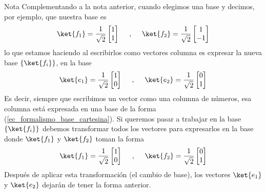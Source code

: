 \documentclass[a4paper,11pt]{book} %
\numberwithin{equation}{chapter}
\begin{document}
	\begin{mybox_blue}{Nota}
	Complementando a la nota anterior, cuando elegimos una base y decimos, por ejemplo, que nuestra base es
		\begin{equation*}
		\ket{f_1} = \frac{1}{\sqrt{2}}\begin{bmatrix}
		1 \\ 1
		\end{bmatrix} ~~~~,~~~~
		\ket{f_2} = \frac{1}{\sqrt{2}}\begin{bmatrix}
		1 \\ - 1
		\end{bmatrix}
		\end{equation*}
	lo que estamos haciendo al escribirlos como vectores columna es expresar la nueva base $\{\ket{f_i}\}$, en la base
		\begin{equation*}
		\ket{e_1} = \frac{1}{\sqrt{2}}\begin{bmatrix}
		1 \\ 0
		\end{bmatrix} ~~~~,~~~~
		\ket{e_2} = \frac{1}{\sqrt{2}}\begin{bmatrix}
		0 \\  1
		\end{bmatrix}
		\end{equation*}
	Es decir, siempre que escribimos un vector como una columna de números, esa columna está expresada en una base de la forma (\ref{ec_formalismo_base_cartesina}). Si queremos pasar a trabajar en la base $\{\ket{f_i}\}$ debemos transformar todos los vectores para expresarlos en la base donde $\ket{f_1}$ y $\ket{f_2}$ toman la forma
		\begin{equation*}
		\ket{f_1} = \frac{1}{\sqrt{2}}\begin{bmatrix}
		1 \\ 0
		\end{bmatrix} ~~~~,~~~~
		\ket{f_2} = \frac{1}{\sqrt{2}}\begin{bmatrix}
		0 \\  1
		\end{bmatrix}
		\end{equation*}
	Después de aplicar esta transformación (el cambio de base), los vectores $\ket{e_1}$ y $\ket{e_2}$ dejarán de tener la forma anterior.
	\end{mybox_blue}
\end{document}
